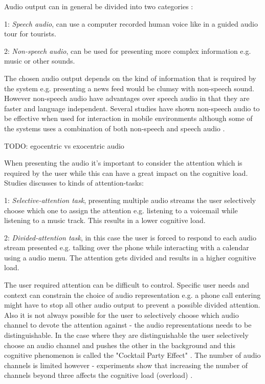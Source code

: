 Audio output can in general be divided into two categories \cite{rocchesso_sounding_2003}:
\begin{description}
\item{1: \textit{Speech audio}}, can use a computer recorded human voice like in a guided audio tour for tourists.
\item{2: \textit{Non-speech audio}}, can be used for presenting more complex information e.g. music or other sounds.
\end{description}

The chosen audio output depends on the kind of information that is required by the system e.g. presenting a news feed would be clumsy with non-speech sound. However non-speech audio have advantages over speech audio in that they are faster and language independent. Several studies have shown non-speech audio to be effective when used for interaction in mobile environments although some of the systems uses a combination of both non-speech and speech audio \cite{pirhonen_gestural_2002, sawhney_nomadic_2000, brewster_using_2000}.

TODO: egocentric vs exocentric audio

When presenting the audio it's important to consider the attention which is required by the user while this can have a great impact on the cognitive load. Studies \cite{vazquez-alvarez_eyes-free_2011, shinn-cunningham_selective_2004} discusses to kinds of attention-tasks:

\begin{description}
\item{1: \textit{Selective-attention task}}, presenting multiple audio streams the user selectively choose which one to assign the attention e.g. listening to a voicemail while listening to a music track. This results in a lower cognitive load.

\item{2: \textit{Divided-attention task}}, in this case the user is forced to respond to each audio stream presented e.g. talking over the phone while interacting with a calendar using a audio menu. The attention gets divided and results in a higher cognitive load.
\end{description}

The user required attention can be difficult to control. Specific user needs and context can constrain the choice of audio representation e.g. a phone call entering might have to stop all other audio output to prevent a possible divided attention. Also it is not always possible for the user to selectively choose which audio channel to devote the attention against - the audio representations needs to be distinguishable. In the case where they are distinguishable the user selectively choose an audio channel and pushes the other in the background and this cognitive phenomenon is called the "Cocktail Party Effect" \cite{bronkhorst_cocktail_2000}. The number of audio channels is limited however - experiments show that increasing the number of channels beyond three affects the cognitive load (overload) \cite{bronkhorst_cocktail_2000}.

